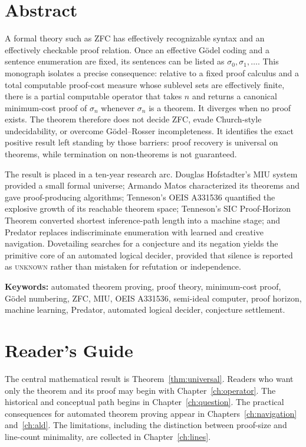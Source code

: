 \documentclass[11pt,oneside]{book}
\theoremstyle{definition}
\theoremstyle{remark}
\begin{document}
\chapter*{Abstract}
A formal theory such as ZFC has effectively recognizable syntax and an effectively checkable proof relation. Once an effective G\"odel coding and a sentence enumeration are fixed, its sentences can be listed as $\sigma_0,\sigma_1,\ldots$. This monograph isolates a precise consequence: relative to a fixed proof calculus and a total computable proof-cost measure whose sublevel sets are effectively finite, there is a partial computable operator that takes $n$ and returns a canonical minimum-cost proof of $\sigma_n$ whenever $\sigma_n$ is a theorem. It diverges when no proof exists. The theorem therefore does not decide ZFC, evade Church-style undecidability, or overcome G\"odel--Rosser incompleteness. It identifies the exact positive result left standing by those barriers: proof recovery is universal on theorems, while termination on non-theorems is not guaranteed.

The result is placed in a ten-year research arc. Douglas Hofstadter's MIU system provided a small formal universe; Armando Matos characterized its theorems and gave proof-producing algorithms; Tenneson's OEIS A331536 quantified the explosive growth of its reachable theorem space; Tenneson's SIC Proof-Horizon Theorem converted shortest inference-path length into a machine stage; and Predator replaces indiscriminate enumeration with learned and creative navigation. Dovetailing searches for a conjecture and its negation yields the primitive core of an automated logical decider, provided that silence is reported as \textsc{unknown} rather than mistaken for refutation or independence.

\noindent\textbf{Keywords:} automated theorem proving, proof theory, minimum-cost proof, G\"odel numbering, ZFC, MIU, OEIS A331536, semi-ideal computer, proof horizon, machine learning, Predator, automated logical decider, conjecture settlement.

\tableofcontents
\listoffigures

\chapter*{Reader's Guide}
The central mathematical result is Theorem~\ref{thm:universal}. Readers who want only the theorem and its proof may begin with Chapter~\ref{ch:operator}. The historical and conceptual path begins in Chapter~\ref{ch:question}. The practical consequences for automated theorem proving appear in Chapters~\ref{ch:navigation} and~\ref{ch:ald}. The limitations, including the distinction between proof-size and line-count minimality, are collected in Chapter~\ref{ch:lines}.
\end{document}

